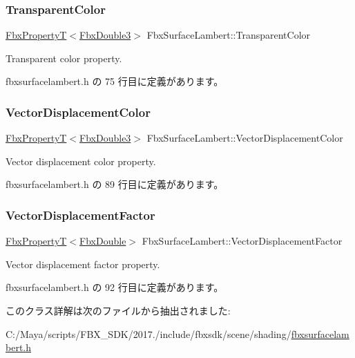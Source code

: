 \subsubsection{\texorpdfstring{Transparent\+Color}{TransparentColor}}
{\footnotesize\ttfamily \hyperlink{class_fbx_property_t}{Fbx\+PropertyT}$<$\hyperlink{fbxtypes_8h_ae0a96f14cde566774c7553aa7523b7a7}{Fbx\+Double3}$>$ Fbx\+Surface\+Lambert\+::\+Transparent\+Color}



Transparent color property. 



 fbxsurfacelambert.\+h の 75 行目に定義があります。

\mbox{\label{class_fbx_surface_lambert_a917ecf0cc6bbaa04b1378f8951c97ed6}} 
\subsubsection{\texorpdfstring{Vector\+Displacement\+Color}{VectorDisplacementColor}}
{\footnotesize\ttfamily \hyperlink{class_fbx_property_t}{Fbx\+PropertyT}$<$\hyperlink{fbxtypes_8h_ae0a96f14cde566774c7553aa7523b7a7}{Fbx\+Double3}$>$ Fbx\+Surface\+Lambert\+::\+Vector\+Displacement\+Color}



Vector displacement color property. 



 fbxsurfacelambert.\+h の 89 行目に定義があります。

\mbox{\label{class_fbx_surface_lambert_aaf322b932e6f2213e13b5b88ba5a0ff9}} 
\subsubsection{\texorpdfstring{Vector\+Displacement\+Factor}{VectorDisplacementFactor}}
{\footnotesize\ttfamily \hyperlink{class_fbx_property_t}{Fbx\+PropertyT}$<$\hyperlink{fbxtypes_8h_a171e72a1c46fc15c1a6c9c31948c1c5b}{Fbx\+Double}$>$ Fbx\+Surface\+Lambert\+::\+Vector\+Displacement\+Factor}



Vector displacement factor property. 



 fbxsurfacelambert.\+h の 92 行目に定義があります。



このクラス詳解は次のファイルから抽出されました\+:\begin{DoxyCompactItemize}
\item 
C\+:/\+Maya/scripts/\+F\+B\+X\+\_\+\+S\+D\+K/2017./include/fbxsdk/scene/shading/\hyperlink{fbxsurfacelambert_8h}{fbxsurfacelambert.\+h}\end{DoxyCompactItemize}
